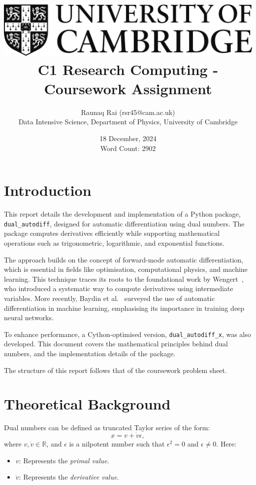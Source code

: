 \documentclass[a4paper,12pt]{article}
\title{
    \includegraphics[scale=0.4]{Cam_logo_bw.png}\\
    \vspace{0.5cm}
    C1 Research Computing - Coursework Assignment
}
\author{Raunaq Rai (rsr45@cam.ac.uk)\\
    Data Intensive Science, Department of Physics, University of Cambridge
}
\date{18 December, 2024 \\ \vspace{0.2cm} {\small Word Count: 2902}}
\begin{document}
\maketitle

\section*{Introduction}
This report details the development and implementation of a Python package, \texttt{dual\_autodiff}, designed for automatic differentiation using dual numbers. The package computes derivatives efficiently while supporting mathematical operations such as trigonometric, logarithmic, and exponential functions.

The approach builds on the concept of forward-mode automatic differentiation, which is essential in fields like optimisation, computational physics, and machine learning. This technique traces its roots to the foundational work by Wengert~\cite{wengert1964automatic}, who introduced a systematic way to compute derivatives using intermediate variables. More recently, Baydin et al.~\cite{baydin2018automatic} surveyed the use of automatic differentiation in machine learning, emphasising its importance in training deep neural networks.

To enhance performance, a Cython-optimised version, \texttt{dual\_autodiff\_x}, was also developed. This document covers the mathematical principles behind dual numbers, and the implementation details of the package.

The structure of this report follows that of the coursework problem sheet.

\section*{Theoretical Background}

Dual numbers can be defined as truncated Taylor series of the form:
\begin{equation}
    x = v + \dot{v}\epsilon,
    \label{eq:dual_number_form}
    \end{equation}
where \(v, \dot{v} \in \mathbb{R}\), and \(\epsilon\) is a nilpotent number such that \(\epsilon^2 = 0\) and \(\epsilon \neq 0\). Here:
\begin{itemize}
    \item \(v\): Represents the \textit{primal value}.
    \item \(\dot{v}\): Represents the \textit{derivative value}.
\end{itemize}
\end{document}
